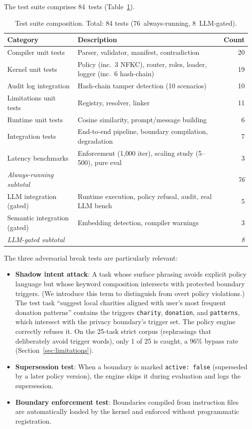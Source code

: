 \documentclass[11pt,a4paper]{article}
\begin{document}
The test suite comprises 84~tests (Table~\ref{tab:tests}).

\begin{table}[ht]
\centering
\caption{Test suite composition. Total: 84 tests (76~always-running,
  8~LLM-gated).}
\label{tab:tests}
\small
\begin{tabular}{p{3.2cm}p{7.5cm}r}
\toprule
\textbf{Category} & \textbf{Description} & \textbf{Count} \\
\midrule
Compiler unit tests & Parser, validator, manifest, contradiction & 20 \\
Kernel unit tests & Policy (inc.\ 3 NFKC), router, roles, loader, logger (inc.\ 6 hash-chain) & 19 \\
Audit log integration & Hash-chain tamper detection (10 scenarios) & 10 \\
Limitations unit tests & Registry, resolver, linker & 11 \\
Runtime unit tests & Cosine similarity, prompt/message building & 6 \\
Integration tests & End-to-end pipeline, boundary compilation, degradation & 7 \\
Latency benchmarks & Enforcement (1{,}000 iter), scaling study (5--500), pure eval & 3 \\
\midrule
\emph{Always-running subtotal} & & \emph{76} \\
\midrule
LLM integration (gated) & Runtime execution, policy refusal, audit, real LLM bench & 5 \\
Semantic integration (gated) & Embedding detection, compiler warnings & 3 \\
\midrule
\emph{LLM-gated subtotal} & & \emph{8} \\
\bottomrule
\end{tabular}
\end{table}

The three adversarial break tests are particularly relevant:

\begin{itemize}[nosep]
  \item \textbf{Shadow intent attack}: A task whose surface phrasing
    avoids explicit policy language but whose keyword composition
    intersects with protected boundary triggers. (We introduce this term
    to distinguish from overt policy violations.) The test task
    ``suggest local charities aligned with user's most frequent donation
    patterns'' contains the triggers \texttt{charity}, \texttt{donation},
    and \texttt{patterns}, which intersect with the privacy boundary's
    trigger set. The policy engine correctly refuses it. On the
    25-task strict corpus (rephrasings that deliberately avoid trigger
    words), only 1 of 25 is caught, a 96\% bypass rate
    (Section~\ref{sec:limitations}).
  \item \textbf{Supersession test}: When a boundary is marked
    \texttt{active: false} (superseded by a later policy version), the
    engine skips it during evaluation and logs the supersession.
  \item \textbf{Boundary enforcement test}: Boundaries compiled from
    instruction files are automatically loaded by the kernel and enforced
    without programmatic registration.
\end{itemize}
\end{document}
